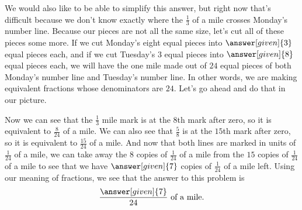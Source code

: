 \documentclass{ximera}
\begin{document}
\begin{question}
\begin{explanation}
We would also like to be able to simplify this answer, but right now that's difficult because we don't know exactly where the $\frac{1}{3}$ of a mile crosses Monday's number line. Because our pieces are not all the same size, let's cut all of these pieces some more. If we cut Monday's eight equal pieces into $\answer[given]{3}$ equal pieces each, and if we cut Tuesday's $3$ equal pieces into $\answer[given]{8}$ equal pieces each, we will have the one mile made out of $24$ equal pieces of both Monday's number line and Tuesday's number line. In other words, we are making equivalent fractions whose denominators are $24$. Let's go ahead and do that in our picture.

\begin{image}
\end{image}

Now we can see that the $\frac{1}{3}$ mile mark is at the $8$th mark after zero, so it is equivalent to $\frac{8}{24}$ of a mile. We can also see that $\frac{5}{8}$ is at the $15$th mark after zero, so it is equivalent to $\frac{15}{24}$ of a mile. And now that both lines are marked in units of $\frac{1}{24}$ of a mile, we can take away the $8$ copies of $\frac{1}{24}$ of a mile from the $15$ copies of $\frac{1}{24}$ of a mile to see that we have $\answer[given]{7}$ copies of $\frac{1}{24}$ of a mile left. Using our meaning of fractions, we see that the answer to this problem is
\[
\frac{\answer[given]{7}}{24} \textrm{ of a mile.}
\]

\end{explanation}

\end{question}
\end{document}
